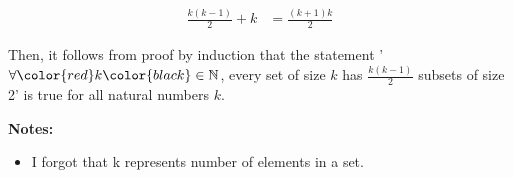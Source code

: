 \documentclass[12pt]{article}
\begin{document}
\begin{enumerate}[a.]
\begin{mdframed}
        \color{red}
        \begin{align}
            \frac{k(k-1)}{2} + k &= \frac{(k+1)k}{2}
        \end{align}
        \color{black}

        \bigskip

        Then, it follows from proof by induction that the statement '$\forall \color{red}k\color{black} \in \mathbb{N}$,
        every set of size \color{red}$k$\color{black} has \color{red}$\frac{k(k-1)}{2}$\color{black} subsets of size 2' is true for all
        natural numbers \color{red}$k$\color{black}.

    \end{mdframed}

    \textbf{Notes:}
    \begin{itemize}
        \item I forgot that k represents number of elements in a set.
    \end{itemize}

\end{enumerate}
\end{document}
